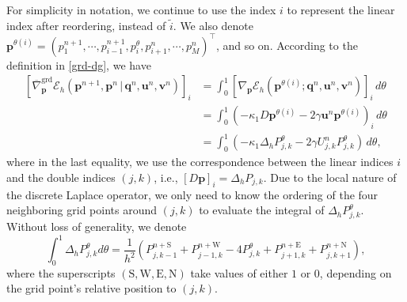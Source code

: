 \documentclass[fleqn,11pt]{elsarticle}
\numberwithin{equation}{section}
\begin{document}
For simplicity in notation, we continue to use the index $i$ to represent the linear index after reordering, instead of $\widetilde{i}$. We also denote $\bm p^{\theta(i)} = (p_1^{n+1}, \cdots, p_{i-1}^{n+1}, p_i^{\theta}, p_{i+1}^n, \cdots, p_M^n)^\top$, and so on. According to the definition in \eqref{grd-dg}, we have
\begin{equation}\label{grd-p}
	\begin{aligned}
		\left[\overline{\nabla}^{\text{grd}}_{\bm p}\mathcal{E}_h(\bm p^{n+1}, \bm p^{n}\,\big|\, \bm q^n, \bm u^n, \bm v^n)\right]_{i}
		 & = \int_0^1 \left[\nabla_{\bm p}\mathcal{E}_h(\bm p^{\theta(i)}; \bm q^n, \bm u^n, \bm v^n)\right]_i \, d\theta \\
		 & = \int_0^1 \left(-\kappa_1 D \bm p^{\theta(i)} - 2\gamma \bm u^n \bm p^{\theta(i)}\right)_i \, d\theta         \\
		 & = \int_0^1 \left(-\kappa_1 \Delta_h P_{j,k}^\theta - 2\gamma U_{j,k}^n P_{j,k}^\theta\right) \, d\theta,
	\end{aligned}
\end{equation}
where in the last equality, we use the correspondence between the linear indices $i$ and the double indices $(j,k)$, i.e., $\left[D \bm p\right]_i = \Delta_h P_{j,k}$. Due to the local nature of the discrete Laplace operator, we only need to know the ordering of the four neighboring grid points around $(j, k)$ to evaluate the integral of $\Delta_h P_{j,k}^\theta$. Without loss of generality, we denote
\begin{equation}\label{LapP}
	\int_0^1\Delta_h P_{j,k}^\theta d\theta= \frac{1}{h^2} \left(P_{j,k-1}^{n+\text{S}} + P_{j-1, k}^{n+\text{W}} - 4 P_{j,k}^{\theta} + P_{j+1, k}^{n+\text{E}} + P_{j, k+1}^{n+\text{N}} \right),
\end{equation}
where the superscripts $(\text{S}, \text{W}, \text{E}, \text{N})$ take values of either $1$ or $0$, depending on the grid point's relative position to $(j, k)$.
\end{document}
